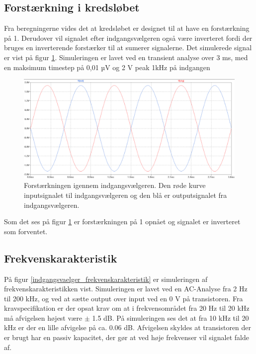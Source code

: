 \subsection*{Forstærkning i kredsløbet}
Fra beregningerne vides det at kredsløbet er designet til at have en forstærkning på 1. Derudover vil signalet efter indgangsvælgeren også være inverteret fordi der bruges en inverterende forstærker til at sumerer signalerne. Det simulerede signal er vist på figur \ref{indgangsvaelger_input/output}. Simuleringen er lavet ved en transient analyse over 3 ms, med en maksimum timestep på 0,01 µV og 2 V peak 1kHz på indgangen
\begin{figure}[h]
\centering
\includegraphics[scale=0.3]{teknisk/indgangsvaelger/simulering/input_output.png}
\caption{Forstærkningen igennem indgangsvælgeren. Den røde kurve inputsignalet til indgangsvælgeren og den blå er outputsignalet fra indgangsvælgeren.}
\label{indgangsvaelger_input/output}
\end{figure}

Som det ses på figur \ref{indgangsvaelger_input/output} er forstærkningen på 1 opnået og signalet er inverteret som forventet.


\subsection*{Frekvenskarakteristik}
På figur \ref{indgangsvaelger_frekvenskarakteristik} er simuleringen af frekvenskarakteristikken vist. Simuleringen er lavet ved en AC-Analyse fra 2 Hz til 200 kHz, og ved at sætte output over input ved en 0 V på transistoren. Fra kravspecifikation er der opsat krav om at i frekvensområdet fra 20 Hz til 20 kHz må afvigelsen højest være $\pm$ 1.5 dB. På simuleringen ses det at fra 10 kHz til 20 kHz er der en lille afvigelse på ca. 0.06 dB. Afvigelsen skyldes at transistoren der er brugt har en passiv kapacitet, der gør at ved høje frekvenser vil signalet falde af.

